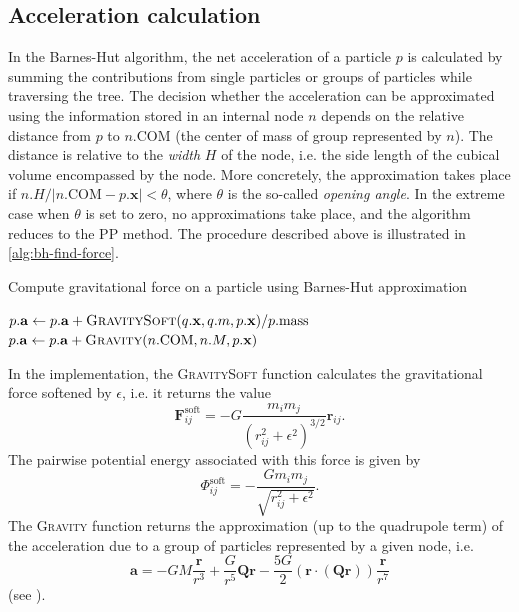 \subsection{Acceleration calculation}
In the Barnes-Hut algorithm, the net acceleration of a particle $p$ is calculated by summing the contributions from single particles or groups of particles while traversing the tree.
The decision whether the acceleration can be approximated using the information stored in an internal node $n$ depends on the relative distance from $p$ to $n.\textrm{COM}$ (the center of mass of group represented by $n$).
The distance is relative to the \textit{width} $H$ of the node, i.e. the side length of the cubical volume encompassed by the node.
More concretely, the approximation takes place if $n.H / |n.\mathrm{COM} - p.\mathbf{x}| < \theta$, where $\theta$ is the so-called \textit{opening angle}.
In the extreme case when $\theta$ is set to zero, no approximations take place, and the algorithm reduces to the PP method.
The procedure described above is illustrated in \autoref{alg:bh-find-force}.
\begin{algorithm}
    \caption{Compute gravitational force on a particle using Barnes-Hut approximation}
    \label{alg:bh-find-force}
    \begin{algorithmic}[1]
        \State $p.\mathbf{a} \gets p.\mathbf{a} + \Call{GravitySoft}{q.\mathbf{x}, q.m, p.\mathbf{x}} / p.\text{mass}$
        \EndIf
        \State \Return
        \EndIf
        \State $p.\mathbf{a} \gets p.\mathbf{a} + \Call{Gravity}{n.\mathrm{COM}, n.M, p.\mathbf{x}}$
        \State \Return
        \EndIf
        \State {}
        \EndFor
        \EndFunction
    \end{algorithmic}
\end{algorithm}
In the implementation, the \textsc{GravitySoft} function calculates the gravitational force softened by $\epsilon$, i.e. it returns the value
\begin{equation*}
    \mathbf{F}^\textrm{soft}_{ij} = -G\frac{m_i m_j}{(r_{ij}^2 + \epsilon^2)^{3/2}}\mathbf{r}_{ij}.
\end{equation*}
The pairwise potential energy associated with this force is given by
\begin{equation}\label{eq:pe-soft}
    \Phi_{ij}^\textrm{soft} = - \frac{G m_i m_j}{\sqrt{r_{ij}^2 + \epsilon^2}}.
\end{equation}
The \textsc{Gravity} function returns the approximation (up to the quadrupole term) of the acceleration due to a group of particles represented by a given node, i.e.
\begin{equation*}
    \mathbf{a} = -GM \frac{\mathbf{r}}{r^3} + \frac{G}{r^5}\mathbf{Q}\mathbf{r} - \frac{5G}{2}(\mathbf{r} \cdot (\mathbf{Q} \mathbf{r})) \frac{\mathbf{r}}{r^7}
\end{equation*}
(see \cite{hernquist1987performance}).

